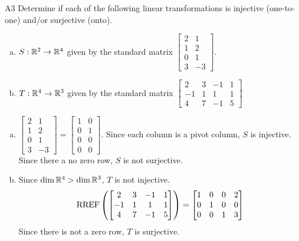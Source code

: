 \begin{problem}{A3}
Determine if each of the following linear transformations is injective (one-to-one) and/or surjective (onto).
\begin{enumerate}[(a)]
\item $S: \mathbb{R}^2 \rightarrow \mathbb{R}^4$ given by the standard matrix $\begin{bmatrix} 2 & 1 \\ 1 & 2 \\ 0 & 1 \\ 3 & -3 \end{bmatrix}$.
\item $T: \mathbb{R}^4 \rightarrow \mathbb{R}^3$ given by the standard matrix $\begin{bmatrix} 2 & 3 & -1 & 1 \\ -1 & 1 & 1 & 1 \\ 4 & 7 & -1 & 5 \end{bmatrix}$
\end{enumerate}
\end{problem}
\begin{solution}
\begin{enumerate}[(a)]
\item $ \begin{bmatrix} 2 & 1 \\ 1 & 2 \\ 0 & 1 \\ 3 & -3 \end{bmatrix}=\begin{bmatrix}1 & 0 \\ 0 & 1 \\ 0 & 0 \\ 0 & 0  \end{bmatrix}$.  Since each column is a pivot column, $S$ is injective.  Since there a no zero row, $S$ is not surjective.
\item Since $\dim \mathbb{R}^4 > \dim \mathbb{R}^3$, $T$ is not injective.
$$\operatorname{RREF}\left(\begin{bmatrix} 2 & 3 & -1 & 1 \\ -1 & 1 & 1 & 1 \\ 4 & 7 & -1 & 5 \end{bmatrix}\right) = \begin{bmatrix} 1 & 0  & 0 & 2 \\ 0 & 1 & 0 & 0  \\ 0 & 0 & 1 & 3 \end{bmatrix}$$
Since there is not a zero row, $T$ is surjective.
\end{enumerate}
\end{solution}

